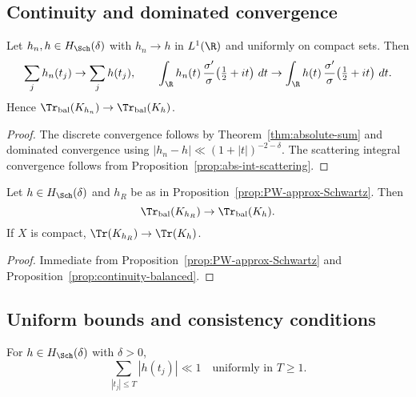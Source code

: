 \subsection{Continuity and dominated convergence}
\label{subsec:continuity-DC}

\begin{proposition}
\label{prop:continuity-balanced}
Let $h_n,h\in H_{\Sch}(\delta)$ with $h_n\to h$ in $L^1(\R)$ and uniformly on compact sets. Then
\[
  \sum_j h_n(t_j) \to \sum_j h(t_j),\qquad
  \int_{\R} h_n(t)\,\frac{\sigma'}{\sigma}\!\left(\tfrac12+it\right)\,dt
   \to
  \int_{\R} h(t)\,\frac{\sigma'}{\sigma}\!\left(\tfrac12+it\right)\,dt.
\]
Hence $\Tr_{\mathrm{bal}}(K_{h_n})\to \Tr_{\mathrm{bal}}(K_h)$.
\end{proposition}

\begin{proof}
The discrete convergence follows by Theorem~\ref{thm:absolute-sum} and dominated convergence using $|h_n-h|\ll (1+|t|)^{-2-\delta}$. The scattering integral convergence follows from Proposition~\ref{prop:abs-int-scattering}.
\end{proof}

\begin{proposition}
\label{prop:continuity-PW-approx}
Let $h\in H_{\Sch}(\delta)$ and $h_R$ be as in Proposition~\ref{prop:PW-approx-Schwartz}. Then
\[
  \Tr_{\mathrm{bal}}(K_{h_R}) \to \Tr_{\mathrm{bal}}(K_h).
\]
If $X$ is compact, $\Tr(K_{h_R})\to \Tr(K_h)$.
\end{proposition}

\begin{proof}
Immediate from Proposition~\ref{prop:PW-approx-Schwartz} and Proposition~\ref{prop:continuity-balanced}.
\end{proof}

\subsection{Uniform bounds and consistency conditions}
\label{subsec:uniform-bounds}

\begin{lemma}
\label{lem:uniform-sum}
For $h\in H_{\Sch}(\delta)$ with $\delta>0$,
\[
  \sum_{|t_j|\le T} |h(t_j)| \ll 1 \quad \text{uniformly in } T\ge 1.
\]
\end{lemma}

